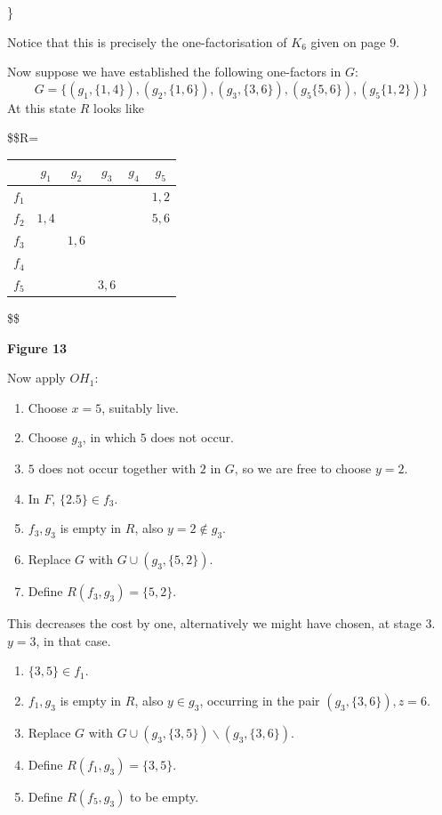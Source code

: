 \documentclass[
  12pt,
  a4paper]{book}
\begin{document}
\}

Notice that this is precisely the one-factorisation of \(K_6\) given on
page 9.

Now suppose we have established the following one-factors in \(G\):
\[G=\{(g_1,\{1,4\}),(g_2,\{1,6\}),(g_3,\{3,6\}),(g_5\{5,6\}),(g_5\{1,2\})\}\]
At this state \(R\) looks like

\$\$R=

\begin{longtable}[]{@{}lccccc@{}}
\toprule
& \(g_1\) & \(g_2\) & \(g_3\) & \(g_4\) & \(g_5\)\tabularnewline
\midrule
\endhead
\(f_1\) & & & & & \(1,2\)\tabularnewline
\(f_2\) & \(1,4\) & & & & \(5,6\)\tabularnewline
\(f_3\) & & \(1,6\) & & &\tabularnewline
\(f_4\) & & & & &\tabularnewline
\(f_5\) & & & \(3,6\) & &\tabularnewline
\bottomrule
\end{longtable}

\$\$

\textbf{Figure 13}

Now apply \(OH_1\):

\begin{enumerate}
\def\labelenumi{\arabic{enumi}.}
\item
  Choose \(x=5\), suitably live.
\item
  Choose \(g_3\), in which \(5\) does not occur.
\item
  \(5\) does not occur together with \(2\) in \(G\), so we are free to
  choose \(y=2\).
\item
  In \(F\), \(\{2.5\} \in f_3\).
\item
  \(f_3,g_3\) is empty in \(R\), also \(y=2 \notin g_3\).
\item
  Replace \(G\) with \(G \cup (g_3,\{5,2\})\).
\item
  Define \(R(f_3,g_3)=\{5,2\}\).
\end{enumerate}

This decreases the cost by one, alternatively we might have chosen, at
stage 3. \(y=3\), in that case.

\begin{enumerate}
\def\labelenumi{\arabic{enumi}.}
\setcounter{enumi}{3}
\item
  \(\{3,5\} \in f_1\).
\item
  \(f_1,g_3\) is empty in \(R\), also \(y \in g_3\), occurring in the
  pair \((g_3,\{3,6\}), z=6\).
\item
  Replace \(G\) with \(G \cup (g_3,\{3,5\}) \backslash (g_3,\{3,6\})\).
\item
  Define \(R(f_1,g_3)=\{3,5\}\).
\item
  Define \(R(f_5,g_3)\) to be empty.
\end{enumerate}
\end{document}
